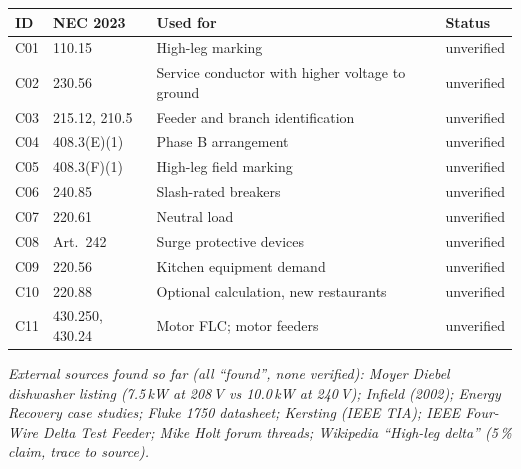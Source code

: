 \documentclass[11pt,a4paper]{article}
\newcommand{\plan}[1]{\par{\small\color{gray}\itshape #1}\par}
\begin{document}
\medskip
\noindent\begin{tabularx}{\linewidth}{@{}l l X l@{}}
\toprule
ID & NEC 2023 & Used for & Status \\
\midrule
C01 & 110.15 & High-leg marking & unverified \\
C02 & 230.56 & Service conductor with higher voltage to ground & unverified \\
C03 & 215.12, 210.5 & Feeder and branch identification & unverified \\
C04 & 408.3(E)(1) & Phase B arrangement & unverified \\
C05 & 408.3(F)(1) & High-leg field marking & unverified \\
C06 & 240.85 & Slash-rated breakers & unverified \\
C07 & 220.61 & Neutral load & unverified \\
C08 & Art.\ 242 & Surge protective devices & unverified \\
C09 & 220.56 & Kitchen equipment demand & unverified \\
C10 & 220.88 & Optional calculation, new restaurants & unverified \\
C11 & 430.250, 430.24 & Motor FLC; motor feeders & unverified \\
\bottomrule
\end{tabularx}

\medskip
\plan{External sources found so far (all ``found'', none verified): Moyer Diebel dishwasher listing (7.5\,kW at 208\,V vs 10.0\,kW at 240\,V); Infield (2002); Energy Recovery case studies; Fluke 1750 datasheet; Kersting (IEEE TIA); IEEE Four-Wire Delta Test Feeder; Mike Holt forum threads; Wikipedia ``High-leg delta'' (5\,\% claim, trace to source).}
\end{document}
